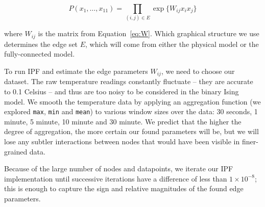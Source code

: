 \begin{equation}
P(x_1,\ldots,x_{11}) = \prod_{(i,j) \in E} \exp\lbrace W_{ij}x_ix_j\rbrace
\end{equation}

where $W_{ij}$ is the matrix from Equation~\ref{eq:W}.
Which graphical structure we use determines the edge set $E$, which will come from either the physical model or the fully-connected model.

To run IPF and estimate the edge parameters $W_{ij}$, we need to choose our dataset.
The raw temperature readings constantly fluctuate -- they are accurate to 0.1 Celsius -- and thus are too noisy to be considered in the binary Ising model.
We smooth the temperature data by applying an aggregation function (we explored \texttt{max}, \texttt{min} and \texttt{mean}) to various window sizes over the data: 30 seconds, 1 minute, 5 minute, 10 minute and 30 minute.
We predict that the higher the degree of aggregation, the more certain our found parameters will be, but we will lose any subtler interactions between nodes that would have been visible in finer-grained data.

Because of the large number of nodes and datapoints, we iterate our IPF implementation until successive iterations have a difference of less than $1 \times 10^{-8}$; this is enough to capture the sign and relative magnitudes of the found edge parameters.
